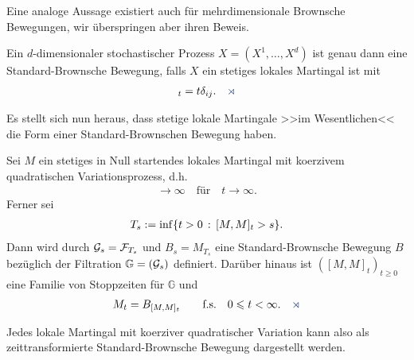 Eine analoge Aussage existiert auch für mehrdimensionale Brownsche Bewegungen,
wir überspringen aber ihren Beweis.

\begin{prop}
\label{prop:2.27}
Ein $d$-dimensionaler stochastischer Prozess $X=(X^1,\ldots,X^d)$ ist genau dann
eine Standard-Brownsche Bewegung, falls $X$ ein stetiges lokales Martingal ist
mit
\begin{align*}
[X^i,X^j]_t = t\delta_{ij}.\fish
\end{align*}
\end{prop}

Es stellt sich nun heraus, dass stetige lokale Martingale >>im Wesentlichen<<
die Form einer Standard-Brownschen Bewegung haben.

\begin{prop}
\label{prop:2.28}
Sei $M$ ein stetiges in Null startendes lokales Martingal mit koerzivem
quadratischen Variationsprozess, d.h.
\begin{align*}
[M,M]  \to
\infty\quad\text{für}\quad t\to \infty.
\end{align*}
Ferner sei
\begin{align*}
T_s \defl \inf\setdef{t > 0}{[M,M]_t > s}.
\end{align*}
Dann wird durch $\mathcal{G}_s = \mathcal{F}_{T_s}$ und $B_s = M_{T_{s}}$ eine
Standard-Brownsche Bewegung $B$ bezüglich der Filtration $\mathbb{G}=(\mathcal{G}_s)$
definiert. Darüber hinaus ist $([M,M]_t)_{t\ge 0}$ eine Familie von Stoppzeiten
für $\mathbb{G}$ und
\begin{align*}
M_t = B_{[M,M]_t}\qquad \fs\quad 0 \le t < \infty.\fish
\end{align*}
\end{prop}

Jedes lokale Martingal mit koerziver quadratischer Variation kann also als
zeittransformierte Standard-Brownsche Bewegung dargestellt werden. 


